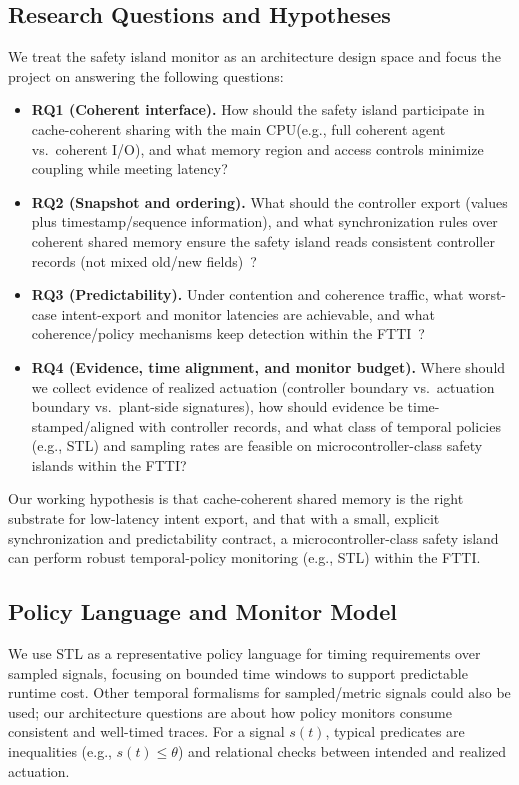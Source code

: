 \documentclass[letterpaper,twocolumn,10pt]{article}
\newcommand{\SafetyIsland}{safety island\xspace}
\newcommand{\STL}{STL\xspace}
\newcommand{\FTTI}{FTTI\xspace}
\newcommand{\PrimaryCompute}{main CPU\xspace}
\begin{document}
\subsection{Research Questions and Hypotheses}
We treat the \SafetyIsland monitor as an architecture design space and focus the project on answering the following questions:
\begin{itemize}
\item \textbf{RQ1 (Coherent interface).} How should the \SafetyIsland participate in cache-coherent sharing with the \PrimaryCompute (e.g., full coherent agent vs.\ coherent I/O), and what memory region and access controls minimize coupling while meeting latency?
\item \textbf{RQ2 (Snapshot and ordering).} What should the controller export (values plus timestamp/sequence information), and what synchronization rules over coherent shared memory ensure the \SafetyIsland reads consistent controller records (not mixed old/new fields)~\cite{Pulte2018SimplifyingARM,CleavelandTrippel2024MemGlue,Goens2023CompoundConsistency}?
\item \textbf{RQ3 (Predictability).} Under contention and coherence traffic, what worst-case intent-export and monitor latencies are achievable, and what coherence/policy mechanisms keep detection within the \FTTI~\cite{Hassan2017PredictableCoherence,Hassan2022IntegratingCOTSCoherence,Chisholm2016TensionIsolationSharing}?
\item \textbf{RQ4 (Evidence, time alignment, and monitor budget).} Where should we collect evidence of realized actuation (controller boundary vs.\ actuation boundary vs.\ plant-side signatures), how should evidence be time-stamped/aligned with controller records, and what class of temporal policies (e.g., \STL) and sampling rates are feasible on microcontroller-class safety islands within the \FTTI?
\end{itemize}

Our working hypothesis is that cache-coherent shared memory is the right substrate for low-latency intent export, and that with a small, explicit synchronization and predictability contract, a microcontroller-class \SafetyIsland can perform robust temporal-policy monitoring (e.g., \STL) within the \FTTI.

\subsection{Policy Language and Monitor Model}
We use \STL as a representative policy language for timing requirements over sampled signals, focusing on bounded time windows to support predictable runtime cost. Other temporal formalisms for sampled/metric signals could also be used; our architecture questions are about how policy monitors consume consistent and well-timed traces. For a signal $s(t)$, typical predicates are inequalities (e.g., $s(t)\leq \theta$) and relational checks between intended and realized actuation.
\end{document}
